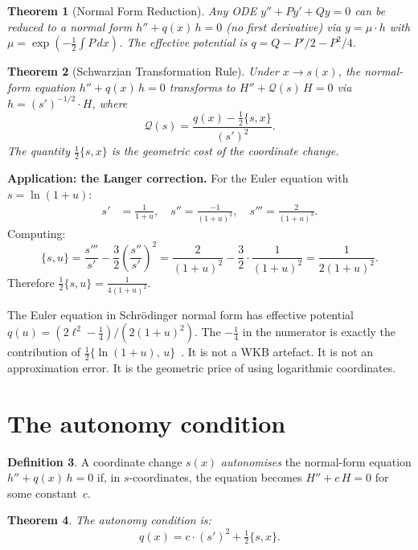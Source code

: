 \documentclass{amsart}
\newtheorem{theorem}{Theorem}[section]
\theoremstyle{definition}
\newtheorem{definition}[theorem]{Definition}
\theoremstyle{remark}
\begin{document}
\begin{theorem}[Normal Form Reduction]\label{thm:normal-form}
Any ODE $y'' + Py' + Qy = 0$ can be reduced to a normal form $h'' + q(x)\,h = 0$ (no first derivative) via $y = \mu\cdot h$ with $\mu = \exp(-\tfrac{1}{2}\int P\,dx)$. The effective potential is $q = Q - P'/2 - P^2/4$.
\end{theorem}

\begin{theorem}[Schwarzian Transformation Rule]\label{thm:schwarzian}
Under $x \to s(x)$, the normal-form equation $h'' + q(x)\,h = 0$ transforms to $H'' + \mathcal{Q}(s)\,H = 0$ via $h = (s')^{-1/2}\cdot H$, where
\[
\mathcal{Q}(s) = \frac{q(x) - \tfrac{1}{2}\{s, x\}}{(s')^2}.
\]
The quantity $\tfrac{1}{2}\{s, x\}$ is the geometric cost of the coordinate change.
\end{theorem}

\textbf{Application: the Langer correction.} For the Euler equation with $s = \ln(1+u)$:
\begin{align*}
s' &= \frac{1}{1+u}, \quad s'' = \frac{-1}{(1+u)^2}, \quad s''' = \frac{2}{(1+u)^3}.
\end{align*}
Computing:
\[
\{s, u\} = \frac{s'''}{s'} - \frac{3}{2}\left(\frac{s''}{s'}\right)^{\!2} = \frac{2}{(1+u)^2} - \frac{3}{2}\cdot\frac{1}{(1+u)^2} = \frac{1}{2(1+u)^2}.
\]
Therefore $\tfrac{1}{2}\{s, u\} = \frac{1}{4(1+u)^2}$.

The Euler equation in Schr\"odinger normal form has effective potential $q(u) = (2\ell^2 - \tfrac{1}{4})/(2(1+u)^2)$. The $-\tfrac{1}{4}$ in the numerator is exactly the contribution of $\tfrac{1}{2}\{\ln(1+u),\, u\}$~\cite{Langer1937}. It is not a WKB artefact. It is not an approximation error. It is the geometric price of using logarithmic coordinates.

\section{The autonomy condition}

\begin{definition}\label{def:autonomise}
A coordinate change $s(x)$ \emph{autonomises} the normal-form equation $h'' + q(x)\,h = 0$ if, in $s$-coordinates, the equation becomes $H'' + c\,H = 0$ for some constant~$c$.
\end{definition}

\begin{theorem}\label{thm:autonomy}
The autonomy condition is:
\[
q(x) = c\cdot(s')^2 + \tfrac{1}{2}\{s, x\}.
\]
\end{theorem}
\end{document}
